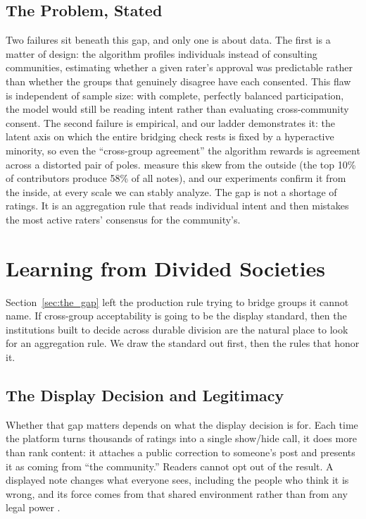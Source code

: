 \documentclass[10pt,twocolumn]{article}
\begin{document}
\subsection*{The Problem, Stated}
Two failures sit beneath this gap, and only one is about data. The first is a matter of design: the algorithm profiles individuals instead of consulting communities, estimating whether a given rater's approval was predictable rather than whether the groups that genuinely disagree have each consented. This flaw is independent of sample size: with complete, perfectly balanced participation, the model would still be reading intent rather than evaluating cross-community consent. The second failure is empirical, and our ladder demonstrates it: the latent axis on which the entire bridging check rests is fixed by a hyperactive minority, so even the ``cross-group agreement'' the algorithm rewards is agreement across a distorted pair of poles. \citet{razuvayevskaya2025timeliness} measure this skew from the outside (the top 10\% of contributors produce 58\% of all notes), and our experiments confirm it from the inside, at every scale we can stably analyze. The gap is not a shortage of ratings. It is an aggregation rule that reads individual intent and then mistakes the most active raters' consensus for the community's.

\section{Learning from Divided Societies}
\label{sec:learning}

Section~\ref{sec:the_gap} left the production rule trying to bridge groups it
cannot name. If cross-group acceptability is going to be the display standard,
then the institutions built to decide across durable division are the natural
place to look for an aggregation rule. We draw the standard out first, then the
rules that honor it.

\subsection*{The Display Decision and Legitimacy}

Whether that gap matters depends on what the display decision is for. Each time
the platform turns thousands of ratings into a single show/hide call, it does
more than rank content: it attaches a public correction to someone's post and
presents it as coming from ``the community.'' Readers cannot opt out of the
result. A displayed note changes what everyone sees, including the people who
think it is wrong, and its force comes from that shared environment rather than
from any legal power \citep{klonick2018governors}.
\end{document}
